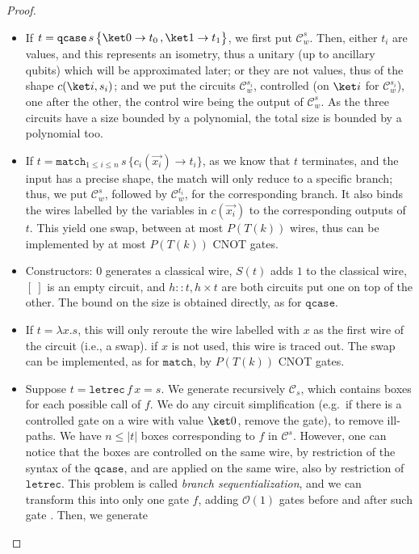 \documentclass[10pt,a4paper]{article}
\newcommand{\nil}{[~]}
\newcommand{\textqcase}{\ensuremath{\mathtt{qcase}}}
\newcommand{\textmatch}{\ensuremath{\mathtt{match}}}
\newcommand{\textletrec}{\ensuremath{\mathtt{letrec}}}
\newcommand{\zket}{\ket 0}
\newcommand{\oket}{\ket 1}
\newcommand{\qcasebase}[2]{
  \textqcase\,#1\left\{\! \begin{aligned} #2 \end{aligned}\right\}
}
\newcommand{\qcase}[3]{
  \qcasebase {#1} {\zket \to #2\,, \oket \to #3}
}
\newcommand{\qcasedefault}[1]{\ensuremath{\qcase{#1}{t_0}{t_1}}}
\newcommand{\matchdefaultcollapsedany}[2]{
  \textmatch_{1 \leq i \leq n}\,#1\,\{
    c_i(\overrightarrow{x_i}) \to #2_i
  \}
}
\newcommand{\matchdefaultcollapsed}[1]{\matchdefaultcollapsedany{#1}{t}}
\newcommand{\lbd}[2]{\lambda #1 .#2}
\newcommand{\letrec}[3]{\textletrec\,#1\,#2=#3}
\newcommand{\size}[1]{|#1|}
\newcommand{\seq}[1]{\overrightarrow{#1}}
\newcommand{\bigo}[1]{\mathcal O({#1})}
\newcommand{\mcC}{\mathcal C}
\begin{document}
\begin{proof}
  \begin{itemize}
    \item If $t = \qcasedefault s$, we first put $\mcC_w^s$. Then, either $t_i$
      are values, and this represents an isometry, thus a unitary (up to
      ancillary qubits) which will be approximated later; or they are
      not values, thus of the shape $c(\ket i, s_i)$; and we put the circuits
      $\mcC_w^{s_i}$, controlled (on $\ket i$ for $\mcC_w^{s_i}$), one after
      the other, the control wire being the output of $\mcC_w^s$. As the
      three circuits have a size bounded by a polynomial, the total size is
      bounded by a polynomial too.
    \item If $t = \matchdefaultcollapsed s$, as we know that $t$ terminates, and
      the input has a precise shape, the match will only reduce to a
      specific branch; thus, we put $\mcC_w^s$, followed by $\mcC_w^{t_i}$, for
      the corresponding branch. It also binds the wires labelled by
      the variables in $c(\seq{x_i})$ to the corresponding outputs of $t$. This
      yield one swap, between at most $P(T(k))$ wires, thus can be implemented
      by at most $P(T(k))$ CNOT gates.
    \item Constructors: $0$ generates a classical wire, $S(t)$ adds $1$ to the
      classical wire, $\nil$ is an empty circuit, and $h::t, h \times t$ are
      both circuits put one on top of the other. The bound on the size is
      obtained directly, as for \textqcase{}.
    \item If $t = \lbd x s$, this will only reroute the wire
      labelled with $x$ as the first wire of the circuit (i.e., a swap). if $x$
      is not used, this wire is traced out. The swap can be implemented, as for
      \textmatch{}, by $P(T(k))$ CNOT gates.
    \item Suppose $t = \letrec f x s$. We generate recursively $\mcC_s$, which
      contains boxes for each possible call of $f$. We do any circuit
      simplification (e.g.\ if there is a controlled gate on a wire with value
      $\ket 0$, remove the gate), to remove ill-paths. We have $n \leq \size t$
      boxes corresponding to $f$ in $\mcC^s$. However, one can notice that
      the boxes are controlled on the same wire, by restriction of the syntax
      of the \textqcase{}, and are applied on the same wire, also by restriction
      of \textletrec{}. This problem is called \emph{branch
      sequentialization}, and
      we can transform this into only one gate $f$, adding $\bigo 1$ gates
      before and after such gate \cite[Theorem 9]{HPS25}. Then, we generate

\end{itemize}
\end{proof}
\end{document}
